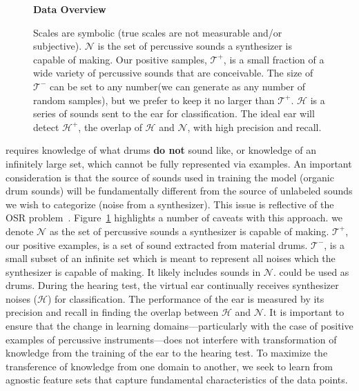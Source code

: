\documentclass[runningheads,a4paper]{llncs}
\begin{document}
\begin{figure}[htbp!]
    \begin{center}
    \textbf{Data Overview}
    \end{center}
    \caption{ 
    Scales are symbolic (true scales are not measurable and/or subjective).  $\mathcal{N}$ is the set of percussive sounds a synthesizer is capable of making. Our positive samples, $\mathcal{T^{+}}$, is a small fraction of a wide variety of percussive sounds that are conceivable. The size of $\mathcal{T^{-}}$ can be set to any number(we can generate as any number of random samples), but we prefer to keep it no larger than  $\mathcal{T^{+}}$. $\mathcal{H}$ is a series of sounds sent to the ear for classification. The ideal ear will detect  $\mathcal{H^{+}}$, the overlap of $\mathcal{H}$ and $\mathcal{N}$, with high precision and recall. 
    }
\label{fig:ven_data}
\end{figure}
 requires knowledge of what drums \textbf{do not} sound like, or knowledge of an infinitely large set, which cannot be fully represented via examples. An important consideration is that the source of sounds used in training the model (organic drum sounds) will be fundamentally different from the source of unlabeled sounds we wish to categorize (noise from a synthesizer). This issue is reflective of the OSR problem~\cite{geng2020recent,mundt2019open}. Figure~\ref{fig:ven_data} highlights a number of caveats with this approach. we denote $\mathcal{N}$ as the set of percussive sounds a synthesizer is capable of making. $\mathcal{T^{+}}$, our positive examples, is a set of sound extracted from material drums. $\mathcal{T^{-}}$, is a small subset of an infinite set which is meant to represent all noises which the synthesizer is capable of making. It likely includes sounds in $\mathcal{N}$. could be used as drums. During the hearing test, the virtual ear continually receives synthesizer noises ($\mathcal{H}$) for classification. The performance of the ear is measured by its precision and recall in finding the overlap between $\mathcal{H}$ and $\mathcal{N}$. It is important to ensure that the change in learning domains---particularly with the case of positive examples of percussive instruments---does not interfere with transformation of knowledge from the training of the ear to the hearing test. To maximize the transference of knowledge from one domain to another, we seek to learn from agnostic feature sets that capture fundamental characteristics of the data points.
\end{document}
